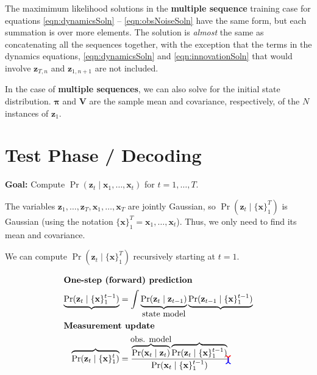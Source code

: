 \documentclass[11pt]{article}
\newcommand{\tikzmark}[1]{\tikz[overlay,remember picture] \node (#1) {};}
\newcommand{\xb}{\mathbf{x}}
\newcommand{\zb}{\mathbf{z}}
\begin{document}
The maximimum likelihood solutions in the \textbf{multiple sequence} training
case for equations \eqref{eqn:dynamicsSoln} -- \eqref{eqn:obsNoiseSoln} have
the same form, but each summation is over more elements. The solution is
\textit{almost} the same as concatenating all the sequences together, with
the exception that the terms in the dynamics equations, \eqref{eqn:dynamicsSoln}
and \eqref{eqn:innovationSoln} that would involve $\zb_{T,n}$ and $\zb_{1,n+1}$
are not included.

In the case of \textbf{multiple sequences}, we can also solve for the initial
state distribution. $\symbf{\pi}$ and $\mathbf{V}$ are the sample mean and
covariance, respectively, of the $N$ instances of $\zb_1$.

\section{Test Phase / Decoding}
\textbf{Goal:} Compute $\Pr(\zb_t \mid \xb_1, \ldots, \xb_t)$ for $t=1, \ldots, T$.

The variables $\zb_1, \ldots, \zb_T, \xb_1, \ldots, \xb_T$ are jointly
Gaussian, so $\Pr(\zb_t \mid \{\xb\}_1^T)$ is Gaussian (using the notation
$\{\xb\}_1^T = \xb_1, \ldots, \xb_t$). Thus, we only need to find its mean
and covariance.

We can compute $\Pr(\zb_t \mid \{\xb\}_1^T)$ recursively starting at $t=1$.

\begin{align}
  \intertext{\textbf{One-step (forward) prediction}}
  \underbrace{\Pr(\zb_t \mid \{\xb\}_1^{t-1})}_{\tikzmark{a}} &= \int
  \underbrace{\Pr(\zb_t \mid \zb_{t-1})}_{\mathclap{\text{\normalsize state model}}}
  \underbrace{\Pr(\zb_{t-1} \mid \{\xb\}_1^{t-1})}_{\tikzmark{c}}
  \label{eqn:forward}\\
  \intertext{\textbf{Measurement update}}
  \overbrace{\Pr(\zb_t \mid \{\xb\}_1^t)}^{\tikzmark{d}} &= \frac{
  \overbrace{\Pr(\xb_t \mid \zb_t)}^{\mathclap{\text{\normalsize obs. model}}}
  \overbrace{\Pr(\zb_t \mid \{\xb\}_1^{t-1})}^{\tikzmark{b}}}
  {\Pr(\xb_t \mid \{\xb\}_1^{t-1})}
  \label{eqn:update}
  \begin{tikzpicture}[overlay,remember picture,very thick]
    \draw (a.center) edge[out=270, in=90, ->,red] (b.north);
    \draw (d.north) edge[out=90, in=270, ->,blue]  (c.center);
  \end{tikzpicture}
\end{align}
\end{document}
